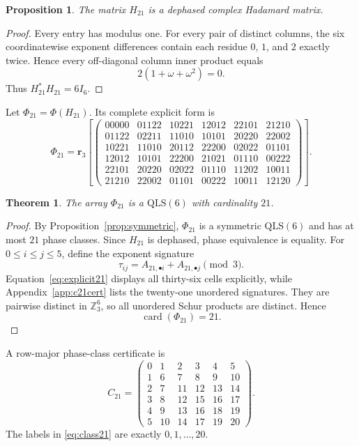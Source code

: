 \documentclass[11pt,a4paper]{article}
\newcommand{\Z}{\mathbb{Z}}
\newcommand{\QLS}{\mathrm{QLS}}
\newcommand{\card}{\operatorname{card}}
\newtheorem{proposition}{Proposition}
\newtheorem{theorem}{Theorem}
\begin{document}
\begin{proposition}\label{prop:H21had}
The matrix $H_{21}$ is a dephased complex Hadamard matrix.
\end{proposition}

\begin{proof}
Every entry has modulus one.  For every pair of distinct columns, the six
coordinatewise exponent differences contain each residue $0$, $1$, and $2$
exactly twice.  Hence every off-diagonal column inner product equals
\[
  2(1+\omega+\omega^2)=0.
\]
Thus $H_{21}^*H_{21}=6I_6$.
\end{proof}

Let $\Phi_{21}=\Phi(H_{21})$.  Its complete explicit form is
\begin{equation}\label{eq:explicit21}
\Phi_{21}=\mathbf r_3\!\left[
\begin{pmatrix}
00000&01122&10221&12012&22101&21210\\
01122&02211&11010&10101&20220&22002\\
10221&11010&20112&22200&02022&01101\\
12012&10101&22200&21021&01110&00222\\
22101&20220&02022&01110&11202&10011\\
21210&22002&01101&00222&10011&12120
\end{pmatrix}
\right].
\end{equation}

\begin{theorem}\label{thm:c21}
The array $\Phi_{21}$ is a $\QLS(6)$ with cardinality $21$.
\end{theorem}

\begin{proof}
By Proposition~\ref{prop:symmetric}, $\Phi_{21}$ is a symmetric $\QLS(6)$
and has at most $21$ phase classes.  Since $H_{21}$ is dephased, phase
equivalence is equality.  For $0\leq i\leq j\leq5$, define the exponent
signature
\[
  \tau_{ij}=A_{21,\bullet i}+A_{21,\bullet j}\pmod3.
\]
Equation~\eqref{eq:explicit21} displays all thirty-six cells explicitly,
while Appendix~\ref{app:c21cert} lists the twenty-one unordered signatures.
They are pairwise
distinct in $\Z_3^6$, so all unordered Schur products are distinct.  Hence
\[
  \card(\Phi_{21})=21.
\]
\end{proof}

A row-major phase-class certificate is
\begin{equation}\label{eq:class21}
C_{21}=
\begin{pmatrix}
0&1&2&3&4&5\\
1&6&7&8&9&10\\
2&7&11&12&13&14\\
3&8&12&15&16&17\\
4&9&13&16&18&19\\
5&10&14&17&19&20
\end{pmatrix}.
\end{equation}
The labels in \eqref{eq:class21} are exactly $0,1,\ldots,20$.
\end{document}
